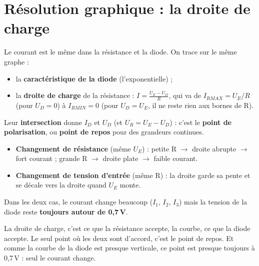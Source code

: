 \section{Résolution graphique : la droite de charge}


\begin{thmbox}[title=Droite de charge et point de repos]
Le courant est le même dans la résistance et la diode. On trace sur le même graphe :
\begin{itemize}
  \item la \textbf{caractéristique de la diode} (l'exponentielle) ;
  \item la \textbf{droite de charge} de la résistance : $I = \frac{U_E - U_D}{R}$, qui va de
        $I_{RMAX} = U_E/R$ (pour $U_D = 0$) à $I_{RMIN} = 0$ (pour $U_D = U_E$, il ne reste
        rien aux bornes de R).
\end{itemize}
Leur \textbf{intersection} donne $I_D$ et $U_D$ (et $U_R = U_E - U_D$) : c'est le
\textbf{point de polarisation}, ou \textbf{point de repos} pour des grandeurs continues.
\end{thmbox}


\begin{propbox}[title={Remarque : courant rapide, tension lente}]
\begin{itemize}
  \item \textbf{Changement de résistance} (même $U_E$) : petite R $\to$ droite abrupte $\to$
        fort courant ; grande R $\to$ droite plate $\to$ faible courant.
  \item \textbf{Changement de tension d'entrée} (même R) : la droite garde sa pente et se
        décale vers la droite quand $U_E$ monte.
\end{itemize}
Dans les deux cas, le courant change beaucoup ($I_1$, $I_2$, $I_3$) mais la tension de la
diode reste \textbf{toujours autour de 0,7\,V}.
\end{propbox}

\begin{goatbox}
La droite de charge, c'est \og ce que la résistance accepte\fg{}, la courbe, \og ce que la
diode accepte\fg{}. Le seul point où les deux sont d'accord, c'est le point de repos. Et comme
la courbe de la diode est presque verticale, ce point est presque toujours à 0,7\,V : seul
le courant change.
\end{goatbox}


